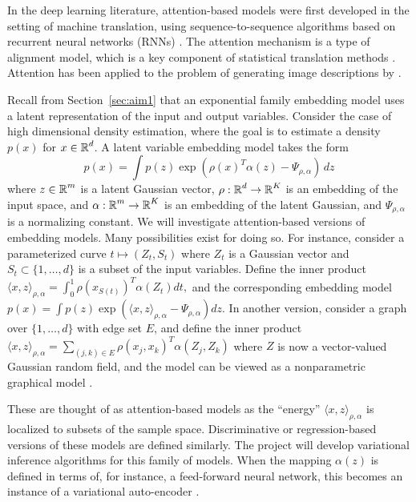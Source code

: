 In the deep learning literature, attention-based models were first
developed in the setting of machine translation, using
sequence-to-sequence algorithms based on recurrent neural networks
(RNNs) \citep{bahdanau2014}. The attention mechanism is a type of alignment model,
which is a key component of statistical translation methods
\citep{Brown1993}. Attention has been applied to the problem of generating image
descriptions by \cite{showtell}.

Recall from Section~\ref{sec:aim1} that an exponential family
embedding model uses a latent representation of the input and output
variables. Consider the case of high dimensional density estimation,
where the goal is to estimate a density $p(x)$ for $x\in\mbox{$\mathbb{R}$}^d$.
A latent variable embedding model takes the form
$$ p(x) = \int p(z) \exp(\rho(x)^T \alpha(z) - \Psi_{\rho,\alpha}) \, dz$$
where $z\in \mbox{$\mathbb{R}$}^m$ is a latent Gaussian vector,
$\rho:\mbox{$\mathbb{R}$}^d \to \mbox{$\mathbb{R}$}^K$ is an embedding of the input space,
and $\alpha: \mbox{$\mathbb{R}$}^m \to\mbox{$\mathbb{R}$}^K$ is an embedding of the latent
Gaussian, and $\Psi_{\rho,\alpha}$ is a normalizing constant.
We will investigate attention-based versions of embedding
models. Many possibilities exist for doing so. For instance, consider a parameterized curve $t\mapsto (Z_t, S_t)$
where $Z_t$ is a Gaussian vector and $S_t \subset \{1,\ldots, d\}$
is a subset of the input variables. Define the inner product 
$\langle x, z\rangle_{\rho,\alpha}
= \int_{0}^1 \rho\left(x_{S(t)}\right)^T \alpha(Z_t) dt,$
and the corresponding embedding model
$ p(x) = \int p(z) \exp\left(\langle x, z\rangle_{\rho,\alpha} - \Psi_{\rho,\alpha}\right) dz.$
In another version, consider a graph over $\{1,\ldots, d\}$ with edge
set $E$, and define the inner product
$\langle x, z\rangle_{\rho,\alpha}
= \sum_{(j,k)\in E} \rho(x_j, x_k)^T \alpha(Z_j, Z_k)$
where $Z$ is now a vector-valued Gaussian random field, 
and the model can be viewed as a nonparametric graphical model
\citep{hl18}.

These are thought of as attention-based models as the ``energy''
$\langle x, z\rangle_{\rho,\alpha}$ is localized to subsets of the
sample space. Discriminative or regression-based versions of these
models are defined similarly. The project will develop variational
inference algorithms for this family of models. When the mapping 
$\alpha(z)$ is defined in terms of, for instance, a feed-forward
neural network, this becomes an instance of a variational auto-encoder
\citep{kingma13}.


\vskip20pt







 
